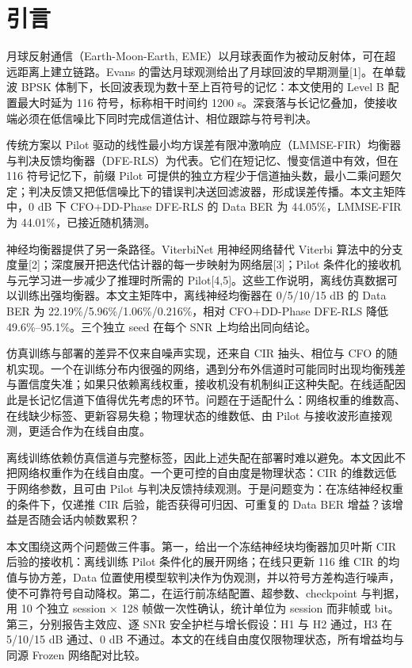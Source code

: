 \section{引言}

月球反射通信（Earth-Moon-Earth, EME）以月球表面作为被动反射体，可在超远距离上建立链路。Evans 的雷达月球观测给出了月球回波的早期测量[1]。在单载波 BPSK 体制下，长回波表现为数十至上百符号的记忆：本文使用的 Level B 配置最大时延为 116 符号，标称相干时间约 1200 s。深衰落与长记忆叠加，使接收端必须在低信噪比下同时完成信道估计、相位跟踪与符号判决。

传统方案以 Pilot 驱动的线性最小均方误差有限冲激响应（LMMSE-FIR）均衡器与判决反馈均衡器（DFE-RLS）为代表。它们在短记忆、慢变信道中有效，但在 116 符号记忆下，前缀 Pilot 可提供的独立方程少于信道抽头数，最小二乘问题欠定；判决反馈又把低信噪比下的错误判决送回滤波器，形成误差传播。本文主矩阵中，0 dB 下 CFO+DD-Phase DFE-RLS 的 Data BER 为 44.05\%，LMMSE-FIR 为 44.01\%，已接近随机猜测。

神经均衡器提供了另一条路径。ViterbiNet 用神经网络替代 Viterbi 算法中的分支度量[2]；深度展开把迭代估计器的每一步映射为网络层[3]；Pilot 条件化的接收机与元学习进一步减少了推理时所需的 Pilot[4,5]。这些工作说明，离线仿真数据可以训练出强均衡器。本文主矩阵中，离线神经均衡器在 0/5/10/15 dB 的 Data BER 为 22.19\%/5.96\%/1.06\%/0.216\%，相对 CFO+DD-Phase DFE-RLS 降低 49.6\%–95.1\%。三个独立 seed 在每个 SNR 上均给出同向结论。

仿真训练与部署的差异不仅来自噪声实现，还来自 CIR 抽头、相位与 CFO 的随机实现。一个在训练分布内很强的网络，遇到分布外信道时可能同时出现均衡残差与置信度失准；如果只依赖离线权重，接收机没有机制纠正这种失配。在线适配因此是长记忆信道下值得优先考虑的环节。问题在于适配什么：网络权重的维数高、在线缺少标签、更新容易失稳；物理状态的维数低、由 Pilot 与接收波形直接观测，更适合作为在线自由度。

离线训练依赖仿真信道与完整标签，因此上述失配在部署时难以避免。本文因此不把网络权重作为在线自由度。一个更可控的自由度是物理状态：CIR 的维数远低于网络参数，且可由 Pilot 与判决反馈持续观测。于是问题变为：在冻结神经权重的条件下，仅递推 CIR 后验，能否获得可归因、可重复的 Data BER 增益？该增益是否随会话内帧数累积？

本文围绕这两个问题做三件事。第一，给出一个冻结神经块均衡器加贝叶斯 CIR 后验的接收机：离线训练 Pilot 条件化的展开网络；在线只更新 116 维 CIR 的均值与协方差，Data 位置使用模型软判决作为伪观测，并以符号方差构造行噪声，使不可靠符号自动降权。第二，在运行前冻结配置、超参数、checkpoint 与判据，用 10 个独立 session × 128 帧做一次性确认，统计单位为 session 而非帧或 bit。第三，分别报告主效应、逐 SNR 安全护栏与增长假设：H1 与 H2 通过，H3 在 5/10/15 dB 通过、0 dB 不通过。本文的在线自由度仅限物理状态，所有增益均与同源 Frozen 网络配对比较。
